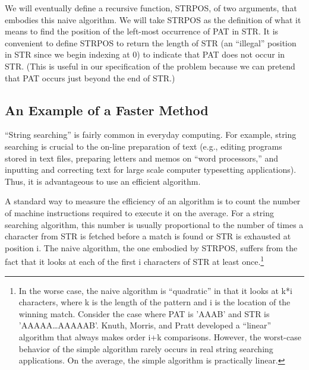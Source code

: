 \documentclass[10pt]{book}
\begin{document}
We will eventually define a recursive function, STRPOS, of two arguments,
that embodies this naive algorithm.  We will take STRPOS as the
definition of what it means to find the position of the left-most
occurrence of PAT in STR.  It is convenient to
define STRPOS to return the length of STR (an ``illegal'' position in
STR since we begin indexing at 0) to indicate that PAT does not
occur in STR.  (This is useful in our specification of the problem
because we can pretend that PAT occurs just beyond the end of STR.)

\subsection{An Example of a Faster Method}
``String searching''  is fairly common in everyday computing.
For example, string searching is crucial to the on-line preparation
of text (e.g., editing programs stored in text files, preparing
letters and memos on ``word processors,'' and  inputting and correcting
text for large scale computer typesetting applications).
Thus, it is advantageous to use an efficient algorithm.

A standard way to measure the efficiency of an algorithm is to
count the number of machine instructions required to execute it
on the average.  For a string searching algorithm, this number is
usually proportional to the number of times a character from STR is
fetched before a match is found or STR is exhausted at position i.  The naive
algorithm, the one embodied by STRPOS, suffers from the fact that 
it looks at each of the first i characters of STR at least once.\footnote{In the worse case, the naive algorithm is ``quadratic'' in that it looks at k*i characters, where k is the length of the pattern and i is the location of the winning match.  Consider the case where PAT is 'AAAB' and STR is 'AAAAA\ldots{}AAAAAB'.  Knuth, Morris, and Pratt \cite{KMP} developed a ``linear'' algorithm that always makes order i+k comparisons.  However, the worst-case behavior of the simple algorithm rarely occurs in real string searching applications.  On the average, the simple algorithm is practically linear.}
\end{document}
